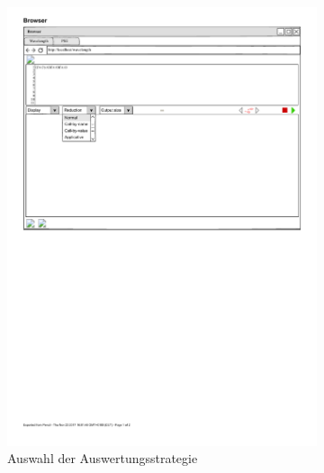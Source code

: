 \documentclass[parskip=full,11pt,twoside]{scrartcl}
\begin{document}
{\begin{figure}[H]
\begin{subfigure}[m]{0.25\textwidth}
		\includegraphics{img/reductionMenu}
	\caption{\label{fig:awsOptions}Auswahl der Auswertungsstrategie}
	\end{subfigure}
	\hspace*{\fill}
	\begin{subfigure}[r]{0.25\textwidth}
	\centering

\end{subfigure}
\end{figure}}
\end{document}
